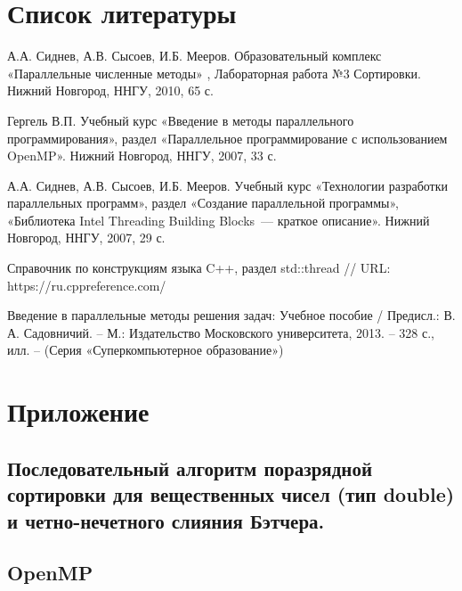 \documentclass{article}
\begin{document}
\section{Список литературы}
\begin{enumerate}

 А.А. Сиднев, А.В. Сысоев, И.Б. Мееров. Образовательный комплекс  «Параллельные численные методы» , Лабораторная работа №3 Сортировки. Нижний Новгород, ННГУ, 2010, 65 с.

 Гергель В.П. Учебный курс «Введение в методы параллельного программирования», раздел «Параллельное программирование с использованием OpenMP». Нижний Новгород, ННГУ, 2007, 33 с.

 А.А. Сиднев, А.В. Сысоев, И.Б. Мееров. Учебный курс «Технологии разработки параллельных программ», раздел «Создание параллельной программы», «Библиотека Intel Threading Building Blocks~--- краткое описание». Нижний Новгород, ННГУ, 2007, 29 с.

 Справочник по конструкциям языка C++, раздел std::thread // URL: https://ru.cppreference.com/

 Введение в параллельные методы решения задач: Учебное пособие / Предисл.: В. А. Садовничий. – М.: Издательство Московского университета, 2013. – 328 с., илл. – (Серия «Суперкомпьютерное образование»)
\end{enumerate}

\newpage

\section{Приложение}
\subsection{Последовательный алгоритм поразрядной сортировки для вещественных чисел (тип double) и  четно-нечетного слияния Бэтчера.}




\subsection{OpenMP}



\end{document}
